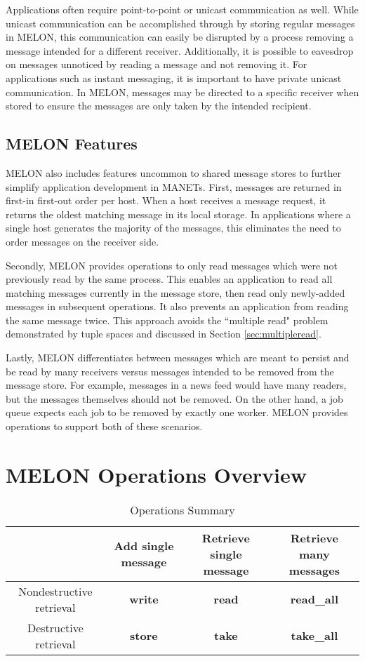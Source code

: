 Applications often require point-to-point or unicast communication as well. While unicast communication can be accomplished through by storing regular messages in MELON, this communication can easily be disrupted by a process removing a message intended for a different receiver. Additionally, it is possible to eavesdrop on messages unnoticed by reading a message and not removing it. For applications such as instant messaging, it is important to have private unicast communication. In MELON, messages may be directed to a specific receiver when stored to ensure the messages are only taken by the intended recipient.

\subsection{MELON Features}

MELON also includes features uncommon to shared message stores to further simplify application development in MANETs. First, messages are returned in first-in first-out order per host. When a host receives a message request, it returns the oldest matching message in its local storage. In applications where a single host generates the majority of the messages, this eliminates the need to order messages on the receiver side.

Secondly, MELON provides operations to only read messages which were not previously read by the same process. This enables an application to read all matching messages currently in the message store, then read only newly-added messages in subsequent operations. It also prevents an application from reading the same message twice. This approach avoids the ``multiple read" problem demonstrated by tuple spaces and discussed in Section \ref{sec:multipleread}.

Lastly, MELON differentiates between messages which are meant to persist and be read by many receivers versus messages intended to be removed from the message store. For example, messages in a news feed would have many readers, but the messages themselves should not be removed. On the other hand, a job queue expects each job to be removed by exactly one worker. MELON provides operations to support both of these scenarios.

\section{MELON Operations Overview}

\begin{table}
\centering
\caption{Operations Summary}
\begin{tabular}{|c|c|c|c|} \hline
& Add single message & Retrieve single message & Retrieve many messages \\ \hline
Nondestructive retrieval & \textbf{write} & \textbf{read} & \textbf{read\_all} \\ \hline
Destructive retrieval & \textbf{store} & \textbf{take} & \textbf{take\_all} \\ \hline
\end{tabular}
\label{table:opsummary}
\end{table}


